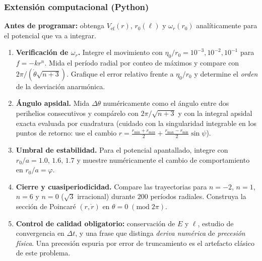 \documentclass[10pt]{beamer}
\newcommand{\Vef}{V_{\mathrm{ef}}}
\newcommand{\dth}{\Delta\theta}          %
\begin{document}
\begin{frame}
\frametitle{Extensión computacional (Python)}
\small
\textbf{Antes de programar:} obtenga $\Vef(r)$, $r_0(\ell)$ y $\omega_r(r_0)$
analíticamente para el potencial que va a integrar.
\begin{enumerate}
  \item<1-> \textbf{Verificación de $\omega_r$.} Integre el movimiento con
        $\eta_0/r_0=10^{-3},10^{-2},10^{-1}$ para $f=-kr^{n}$. Mida el período
        radial por conteo de máximos y compare con $2\pi/(\dot\theta\sqrt{n+3})$.
        Grafique el error relativo frente a $\eta_0/r_0$ y determine el
        \emph{orden} de la desviación anarmónica.
  \item<2-> \textbf{Ángulo apsidal.} Mida $\dth$ numéricamente como el ángulo
        entre dos perihelios consecutivos y compárelo con $2\pi/\sqrt{n+3}$ y
        con la integral apsidal exacta evaluada por cuadratura (cuidado con la
        singularidad integrable en los puntos de retorno: use el cambio
        $r=\frac{r_{\min}+r_{\max}}{2}+\frac{r_{\max}-r_{\min}}{2}\sin\psi$).
  \item<3-> \textbf{Umbral de estabilidad.} Para el potencial apantallado,
        integre con $r_0/a=1.0,\,1.6,\,1.7$ y muestre numéricamente el cambio de
        comportamiento en $r_0/a=\varphi$.
  \item<4-> \textbf{Cierre y cuasiperiodicidad.} Compare las trayectorias para
        $n=-2$, $n=1$, $n=6$ y $n=0$ ($\sqrt3$ irracional) durante $200$
        períodos radiales. Construya la sección de Poincaré $(r,\dot r)$ en
        $\theta=0\;(\mathrm{mod}\;2\pi)$.
  \item<5-> \textbf{Control de calidad obligatorio:} conservación de $E$ y
        $\ell$, estudio de convergencia en $\Delta t$, y una frase que
        distinga \emph{deriva numérica} de \emph{precesión física}. Una
        precesión espuria por error de truncamiento es el artefacto clásico de
        este problema.
\end{enumerate}
\end{frame}
\end{document}
